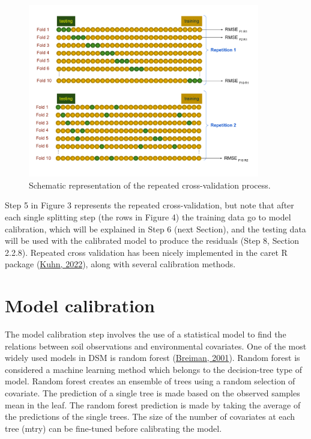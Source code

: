 \documentclass[
  10pt,
  b5paper,
  oneside]{book}
\begin{document}
\begin{figure}[t]
  \centering
  \includegraphics[width=0.9\textwidth]{images/cv.pdf}
  \caption{Schematic representation of the repeated cross-validation process.}
  \label{fig:cv}
\end{figure}

Step 5 in Figure 3 represents the repeated cross-validation, but note that after each single splitting step (the rows in Figure 4) the training data go to model calibration, which will be explained in Step 6 (next Section), and the testing data will be used with the calibrated model to produce the residuals (Step 8, Section 2.2.8).
Repeated cross validation has been nicely implemented in the caret R package (\protect\hyperlink{ref-Kuhn2022}{Kuhn, 2022}), along with several calibration methods.

\hypertarget{model-calibration}{%
\section{Model calibration}\label{model-calibration}}

The model calibration step involves the use of a statistical model to find the relations between soil observations and environmental covariates. One of the most widely used models in DSM is random forest (\protect\hyperlink{ref-Breiman2001}{Breiman, 2001}). Random forest is considered a machine learning method which belongs to the decision-tree type of model. Random forest creates an ensemble of trees using a random selection of covariate. The prediction of a single tree is made based on the observed samples mean in the leaf. The random forest prediction is made by taking the average of the predictions of the single trees. The size of the number of covariates at each tree (mtry) can be fine-tuned before calibrating the model.
\end{document}
